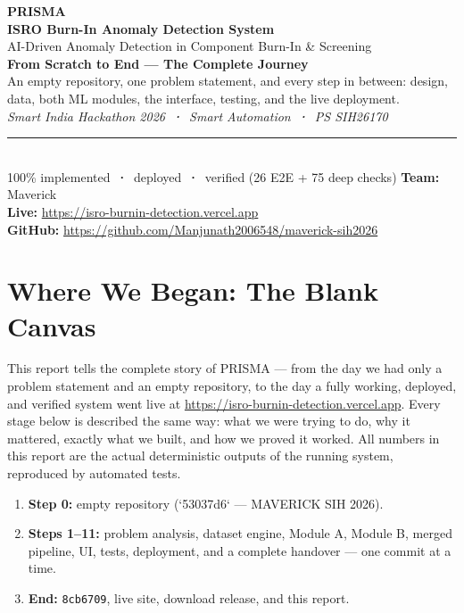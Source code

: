 \documentclass[11pt,a4paper]{article}
\newcommand{\code}[1]{\texttt{\small #1}}
\newcommand{\stagebox}[2]{\par\vspace{1em}\noindent
  \begin{tcolorbox}[colback=isroblue!6,colframe=isroblue,
    title={\sffamily\bfseries\color{white}Stage: #1},arc=2pt,boxrule=1.2pt]
    #2
  \end{tcolorbox}\par\vspace{0.4em}}
\begin{document}
\begin{titlepage}
  \centering
  \vspace*{1.2cm}
  {\Huge\bfseries\color{isroblue} PRISMA}\\[0.5cm]
  {\LARGE\bfseries ISRO Burn-In Anomaly Detection System}\\[0.3cm]
  {\large AI-Driven Anomaly Detection in Component Burn-In \& Screening}\\[1.2cm]
  {\Large\bfseries From Scratch to End --- The Complete Journey}\\[0.3cm]
  {\large An empty repository, one problem statement, and every step in between: design, data,
  both ML modules, the interface, testing, and the live deployment.}\\[1.2cm]
  {\itshape\large Smart India Hackathon 2026 \,\textbf{·}\, Smart Automation \,\textbf{·}\, PS SIH26170}\\[0.8cm]
  {\color{isroorange}\rule{0.6\textwidth}{1pt}}\\[1cm]
  {\normalsize 100\% implemented \,\textbf{·}\, deployed \,\textbf{·}\, verified (26 E2E + 75 deep checks)}
  \vfill
  {\normalsize\textbf{Team:} Maverick}\\[0.2cm]
  {\normalsize\textbf{Live:} \url{https://isro-burnin-detection.vercel.app}}\\[0.2cm]
  {\normalsize\textbf{GitHub:} \url{https://github.com/Manjunath2006548/maverick-sih2026}}
\end{titlepage}

\section{Where We Began: The Blank Canvas}

\stagebox{From zero to a live system}{%
  This report tells the complete story of PRISMA --- from the day we had only a problem statement
  and an empty repository, to the day a fully working, deployed, and verified system went live at
  \url{https://isro-burnin-detection.vercel.app}. Every stage below is described the same way:
  what we were trying to do, why it mattered, exactly what we built, and how we proved it worked.
  All numbers in this report are the actual deterministic outputs of the running system, reproduced
  by automated tests.}

\begin{enumerate}[leftmargin=1.5em]
  \item \textbf{Step 0:} empty repository (`53037d6` --- MAVERICK SIH 2026).
  \item \textbf{Steps 1--11:} problem analysis, dataset engine, Module A, Module B, merged
        pipeline, UI, tests, deployment, and a complete handover --- one commit at a time.
  \item \textbf{End:} \code{8cb6709}, live site, download release, and this report.
\end{enumerate}
\end{document}
